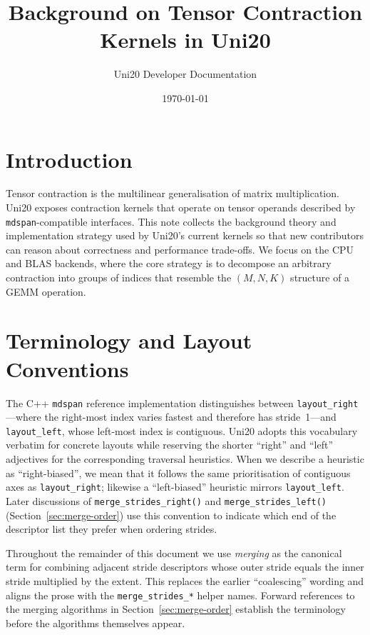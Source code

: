 \documentclass[11pt]{article}
\title{Background on Tensor Contraction Kernels in Uni20}
\author{Uni20 Developer Documentation}
\date{\today}
\begin{document}
\maketitle

\section{Introduction}
Tensor contraction is the multilinear generalisation of matrix multiplication.  Uni20 exposes
contraction kernels that operate on tensor operands described by \texttt{mdspan}-compatible
interfaces.  This note collects the background theory and implementation strategy used by Uni20's
current kernels so that new contributors can reason about correctness and performance trade-offs.
We focus on the CPU and BLAS backends, where the core strategy is to decompose an arbitrary
contraction into groups of indices that resemble the \((M,N,K)\) structure of a GEMM operation.

\section{Terminology and Layout Conventions}\label{sec:terminology}
The C++ \texttt{mdspan} reference implementation distinguishes between
\texttt{layout\_right}---where the right-most index varies fastest and therefore has stride~1---and
\texttt{layout\_left}, whose left-most index is contiguous.  Uni20 adopts this vocabulary verbatim
for concrete layouts while reserving the shorter ``right'' and ``left'' adjectives for the
corresponding traversal heuristics.  When we describe a heuristic as ``right-biased'', we mean that
it follows the same prioritisation of contiguous axes as \texttt{layout\_right}; likewise a
``left-biased'' heuristic mirrors \texttt{layout\_left}.  Later discussions of
\texttt{merge\_strides\_right()} and \texttt{merge\_strides\_left()} (Section~\ref{sec:merge-order})
use this convention to indicate which end of the descriptor list they prefer when ordering strides.

Throughout the remainder of this document we use \emph{merging} as the canonical term for combining
adjacent stride descriptors whose outer stride equals the inner stride multiplied by the extent.
This replaces the earlier ``coalescing'' wording and aligns the prose with the
\texttt{merge\_strides\_*} helper names.  Forward references to the merging algorithms in
Section~\ref{sec:merge-order} establish the terminology before the algorithms themselves appear.
\end{document}
